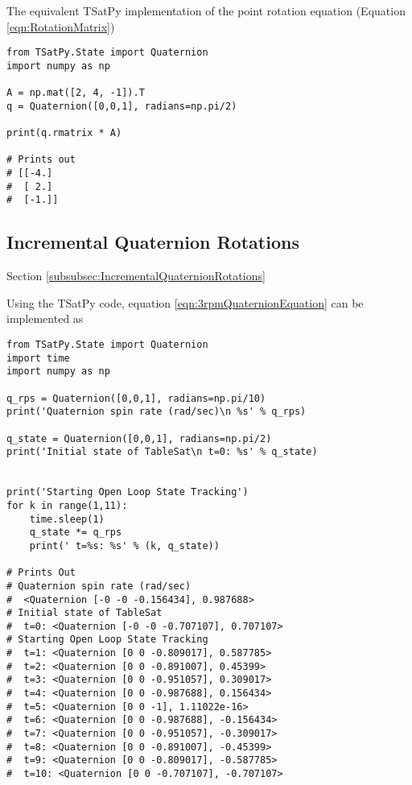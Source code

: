 The equivalent TSatPy implementation of the point rotation equation (Equation \ref{eqn:RotationMatrix})

\begin{singlespace}
  \begin{verbatim}
from TSatPy.State import Quaternion
import numpy as np

A = np.mat([2, 4, -1]).T
q = Quaternion([0,0,1], radians=np.pi/2)

print(q.rmatrix * A)

# Prints out
# [[-4.]
#  [ 2.]
#  [-1.]]
  \end{verbatim}
  \nocite{minted}
\end{singlespace}

\subsection{Incremental Quaternion Rotations}
\label{subsec:Implementation-IncrementalQuaternionRotations}
Section \ref{subsubsec:IncrementalQuaternionRotations}

Using the TSatPy code, equation \ref{eqn:3rpmQuaternionEquation} can be implemented as

\begin{singlespace}
  \begin{verbatim}
from TSatPy.State import Quaternion
import time
import numpy as np

q_rps = Quaternion([0,0,1], radians=np.pi/10)
print('Quaternion spin rate (rad/sec)\n %s' % q_rps)

q_state = Quaternion([0,0,1], radians=np.pi/2)
print('Initial state of TableSat\n t=0: %s' % q_state)


print('Starting Open Loop State Tracking')
for k in range(1,11):
    time.sleep(1)
    q_state *= q_rps
    print(' t=%s: %s' % (k, q_state))

# Prints Out
# Quaternion spin rate (rad/sec)
#  <Quaternion [-0 -0 -0.156434], 0.987688>
# Initial state of TableSat
#  t=0: <Quaternion [-0 -0 -0.707107], 0.707107>
# Starting Open Loop State Tracking
#  t=1: <Quaternion [0 0 -0.809017], 0.587785>
#  t=2: <Quaternion [0 0 -0.891007], 0.45399>
#  t=3: <Quaternion [0 0 -0.951057], 0.309017>
#  t=4: <Quaternion [0 0 -0.987688], 0.156434>
#  t=5: <Quaternion [0 0 -1], 1.11022e-16>
#  t=6: <Quaternion [0 0 -0.987688], -0.156434>
#  t=7: <Quaternion [0 0 -0.951057], -0.309017>
#  t=8: <Quaternion [0 0 -0.891007], -0.45399>
#  t=9: <Quaternion [0 0 -0.809017], -0.587785>
#  t=10: <Quaternion [0 0 -0.707107], -0.707107>
  \end{verbatim}
  \nocite{minted}
\end{singlespace}

